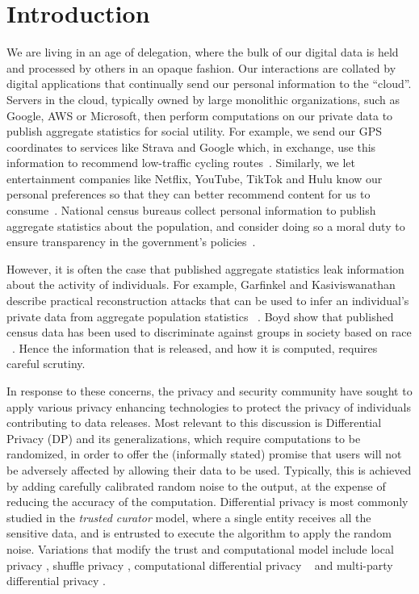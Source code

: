 \section{Introduction}
\label{sec:introduction}

We are living in an age of delegation, where the bulk of our digital
data is held and processed by others in an opaque fashion.  Our
interactions are collated by digital applications that continually
send our personal information to the ``cloud''.  Servers in the cloud,
typically owned by large monolithic organizations, such as Google, AWS
or Microsoft, then perform computations on our private data to publish
aggregate statistics for social utility.  For example, we send our GPS
coordinates to services like Strava and Google which, in exchange, use
this information to recommend low-traffic cycling
routes~\cite{raturi2021impact}.  Similarly, we let entertainment
companies like Netflix, YouTube, TikTok and Hulu know our personal
preferences so that they can better recommend content for us to
consume~\cite{bell2007lessons}.  National census bureaus collect
personal information to publish aggregate statistics about the
population, and consider doing so a moral duty to ensure transparency
in the government's policies~\cite{boyd2022differential}.

However, it is often the case that published aggregate statistics leak
information about the activity of individuals.  For example, Garfinkel
\etal and Kasiviswanathan \etal describe practical reconstruction
attacks that can be used to infer an individual's private data from
aggregate population statistics ~\cite{garfinkel2019understanding,
  kasiviswanathan2013power}.  Boyd \etal show that published census
data has been used to discriminate against groups in society based on
race ~\cite{boyd2022differential}.  Hence the information that is
released, and how it is computed, requires careful scrutiny.

In response to these concerns, the privacy and security community have
sought to apply various privacy enhancing technologies to protect the
privacy of individuals contributing to data releases.  Most relevant
to this discussion is Differential Privacy (DP) and its
generalizations, which require computations to be randomized, in order
to offer the (informally stated) promise that users will not be
adversely affected by allowing their data to be used.  Typically, this
is achieved by adding carefully calibrated random noise to the output,
at the expense of reducing the accuracy of the computation.
Differential privacy is most commonly studied in the \textit{trusted
  curator} model, where a single entity receives all the sensitive
data, and is entrusted to execute the algorithm to apply the random
noise.  Variations that modify the trust and computational model
include local privacy \cite{warner1965randomized}, shuffle privacy
\cite{balle2019privacy, champion2019securely}, computational
differential privacy ~\cite{mironov2009computational} and multi-party
differential privacy \cite{mcgregor2010limits}.

